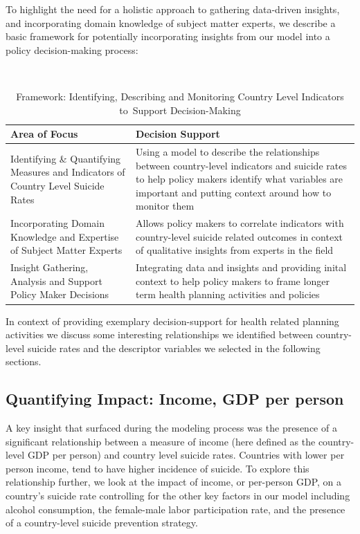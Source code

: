 \documentclass[]{article}
\begin{document}
To highlight the need for a holistic approach to gathering data-driven
insights, and incorporating domain knowledge of subject matter experts,
we describe a basic framework for potentially incorporating insights
from our model into a policy decision-making process:

\begin{table}[H]
\centering 
\caption{Framework: Identifying, Describing and Monitoring Country Level Indicators to Support Decision-Making}
\
\begin{tabular}{p{7cm}p{9cm}}  
\hline  
   Area of Focus  & Decision Support  \\   
\hline 
 Identifying \& Quantifying Measures and Indicators of Country Level Suicide Rates &  Using a model to describe the relationships between country-level indicators and suicide rates to help policy makers identify what variables are important and putting context around how to monitor them \\   
 \hline 
Incorporating Domain Knowledge and Expertise of Subject Matter Experts & Allows policy makers to correlate indicators with country-level suicide related outcomes in context of qualitative insights from experts in the field \\   
\hline 
Insight Gathering, Analysis and Support Policy Maker Decisions & Integrating data and insights and providing inital context to help policy makers to frame longer term health planning activities and policies \\
\hline 
\end{tabular} 
\end{table}

In context of providing exemplary decision-support for health related
planning activities we discuss some interesting relationships we
identified between country-level suicide rates and the descriptor
variables we selected in the following sections.

\subsection{Quantifying Impact: Income, GDP per
person}\label{quantifying-impact-income-gdp-per-person}

A key insight that surfaced during the modeling process was the presence
of a significant relationship between a measure of income (here defined
as the country-level GDP per person) and country level suicide rates.
Countries with lower per person income, tend to have higher incidence of
suicide. To explore this relationship further, we look at the impact of
income, or per-person GDP, on a country's suicide rate controlling for
the other key factors in our model including alcohol consumption, the
female-male labor participation rate, and the presence of a
country-level suicide prevention strategy.
\end{document}
